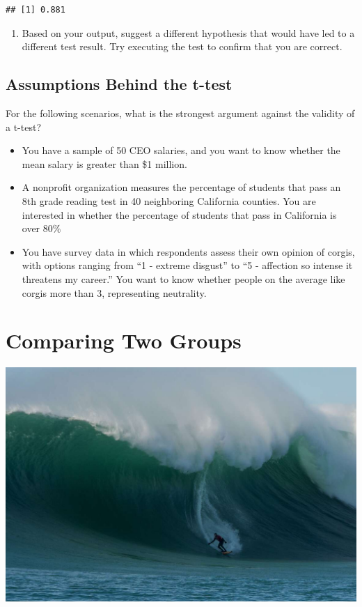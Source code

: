 \documentclass[
]{book}
\providecommand{\tightlist}{%
  \setlength{\itemsep}{0pt}\setlength{\parskip}{0pt}}
\theoremstyle{definition}
\theoremstyle{definition}
\theoremstyle{definition}
\theoremstyle{definition}
\theoremstyle{remark}
\begin{document}
\begin{verbatim}
## [1] 0.881
\end{verbatim}

\begin{enumerate}
\def\labelenumi{\arabic{enumi}.}
\setcounter{enumi}{3}
\tightlist
\item
  Based on your output, suggest a different hypothesis that would have led to a different test result. Try executing the test to confirm that you are correct.
\end{enumerate}

\hypertarget{assumptions-behind-the-t-test}{%
\section{Assumptions Behind the t-test}\label{assumptions-behind-the-t-test}}

For the following scenarios, what is the strongest argument against the validity of a t-test?

\begin{itemize}
\item
  You have a sample of 50 CEO salaries, and you want to know whether the mean salary is greater than \$1 million.
\item
  A nonprofit organization measures the percentage of students that pass an 8th grade reading test in 40 neighboring California counties. You are interested in whether the percentage of students that pass in California is over 80\%
\item
  You have survey data in which respondents assess their own opinion of corgis, with options ranging from ``1 - extreme disgust'' to ``5 - affection so intense it threatens my career.'' You want to know whether people on the average like corgis more than 3, representing neutrality.
\end{itemize}

\hypertarget{comparing-two-groups}{%
\chapter{Comparing Two Groups}\label{comparing-two-groups}}

\includegraphics{./images/goin_left.jpeg}
\end{document}
